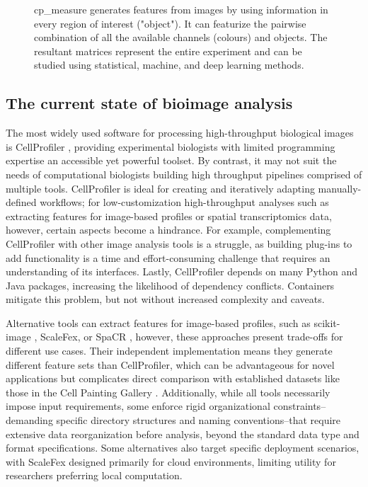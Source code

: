 \documentclass{article}
\begin{document}
\begin{figure}[htbp]
\centering

\caption{\label{fig:overview}cp\_measure generates features from images by using information in every region of interest ("object"). It can featurize the pairwise combination of all the available channels (colours) and objects. The resultant matrices represent the entire experiment and can be studied using statistical, machine, and deep learning methods.}
\end{figure}

\subsection{The current state of bioimage analysis}
\label{sec:org8f5b33d}
The most widely used software for processing high-throughput biological images is CellProfiler \citep{stirlingCellProfiler4Improvements2021}, providing experimental biologists with limited programming expertise an accessible yet powerful toolset. By contrast, it may not suit the needs of computational biologists building high throughput pipelines comprised of multiple tools. CellProfiler is ideal for creating and iteratively adapting manually-defined workflows; for low-customization high-throughput analyses such as extracting features for image-based profiles or spatial transcriptomics data, however, certain aspects become a hindrance. For example, complementing CellProfiler with other image analysis tools is a struggle, as building plug-ins to add functionality is a time and effort-consuming challenge that requires an understanding of its interfaces. Lastly, CellProfiler depends on many Python and Java packages, increasing the likelihood of dependency conflicts. Containers mitigate this problem, but not without increased complexity and caveats.

Alternative tools can extract features for image-based profiles, such as scikit-image \citep{waltScikitimageImageProcessing2014}, ScaleFex, or SpaCR \citep{comoletHighlyEfficientScalable2024,einarolafssonSpaCr2025}, however, these approaches present trade-offs for different use cases. Their independent implementation means they generate different feature sets than CellProfiler, which can be advantageous for novel
 applications but complicates direct comparison with established datasets like those in the Cell Painting Gallery \cite{weisbartCellPaintingGallery2024}. 
Additionally, while all tools necessarily impose input requirements, some enforce rigid organizational constraints--demanding specific directory structures and naming conventions--that require extensive data reorganization before analysis, beyond the standard data type and format specifications.
Some alternatives also target specific deployment scenarios, with ScaleFex designed primarily for cloud environments, limiting utility for researchers preferring local computation.
\end{document}
